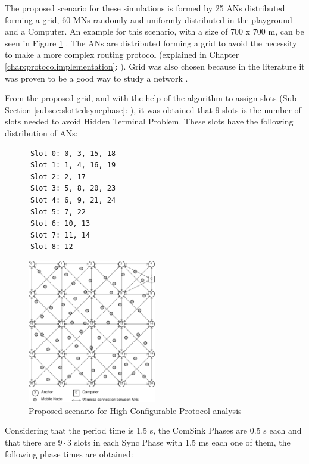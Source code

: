 The proposed scenario for these simulations is formed by 25 \acp{AN} distributed forming a grid, 60 \acp{MN} randomly and uniformly distributed in the
playground and a Computer. An example for this scenario, with a size of 700 x 700 m, can be seen in Figure \ref{fig:finalscenario} . The \acp{AN} 
are distributed forming a grid to avoid the necessity to make a more complex routing protocol (explained in Chapter \ref{chap:protocolimplementation}: 
). Grid was also chosen because in the literature it was proven to be a good way to study a network \cite{GridNetworks}.

From the proposed grid, and with the help of the algorithm to assign slots (Sub-Section \ref{subsec:slottedsyncphase}: 
), it was obtained that 9 slots is the number of slots needed to avoid Hidden Terminal Problem. These slots have the 
following distribution of \acp{AN}:

\begin{verbatim}
      Slot 0: 0, 3, 15, 18
      Slot 1: 1, 4, 16, 19
      Slot 2: 2, 17
      Slot 3: 5, 8, 20, 23
      Slot 4: 6, 9, 21, 24
      Slot 5: 7, 22
      Slot 6: 10, 13
      Slot 7: 11, 14
      Slot 8: 12
\end{verbatim}

\begin{figure}[ht]
 \begin{center}
  \includegraphics[width=0.5\textwidth]{finalscenario.eps}
 \end{center}
 \caption{Proposed scenario for High Configurable Protocol analysis}
 \label{fig:finalscenario}
\end{figure}

Considering that the period time is 1.5 s, the ComSink Phases are 0.5 s each and that there are $9\cdot3$ slots in each Sync Phase with 
1.5 ms each one of them, the following phase times are obtained:

